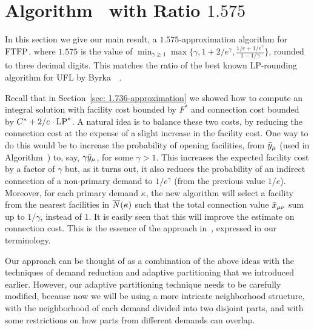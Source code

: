 

\section{Algorithm~{\EBGS} with Ratio $1.575$}\label{sec: 1.575-approximation}

In this section we give our main result, a $1.575$-approximation
algorithm for $\mbox{\rm FTFP}$, where $1.575$ is the value of $\min_{\gamma\geq
  1}\max\{\gamma, 1+2/e^\gamma, \frac{1/e+1/e^\gamma}{1-1/\gamma}\}$,
rounded to three decimal digits. This matches the ratio of the best
known LP-rounding algorithm for UFL by
Byrka~{\etal}~\cite{ByrkaGS10}. 

Recall that in Section~\ref{sec: 1.736-approximation} we showed how to
compute an integral solution with facility cost bounded by $F^\ast$
and connection cost bounded by $C^\ast + 2/e\cdot\mbox{\rm LP}^\ast$. A natural
idea is to balance these two costs, by reducing the connection cost at
the expense of a slight increase in the facility cost. One way to do
this would be to increase the probability of opening facilities, from
${\bar y}_{\mu}$ (used in Algorithm~{\ECHS}) to, say,
$\gamma{\bar y}_{\mu}$, for some $\gamma > 1$. This increases the
expected facility cost by a factor of $\gamma$ but, as it turns out,
it also reduces the probability of an indirect connection of a
non-primary demand to $1/e^\gamma$ (from the previous value
$1/e$). Moreover, for each primary demand $\kappa$, the new algorithm
will select a facility from the nearest facilities in ${\overline{N}}(\kappa)$
such that the total connection value ${\bar x}_{\mu\nu}$ sum up to
$1/\gamma$, instead of $1$. It is easily seen that this will improve
the estimate on connection cost.  This is the essence of the approach
in~\cite{ByrkaGS10}, expressed in our terminology.

Our approach can be thought of as a combination of the above ideas
with the techniques of demand reduction and
adaptive partitioning that we introduced earlier. However, our
adaptive partitioning technique needs to be carefully modified,
because now we will be using a more intricate neighborhood structure,
with the neighborhood of each demand divided into two disjoint parts,
and with some restrictions on how parts from different demands can overlap.

